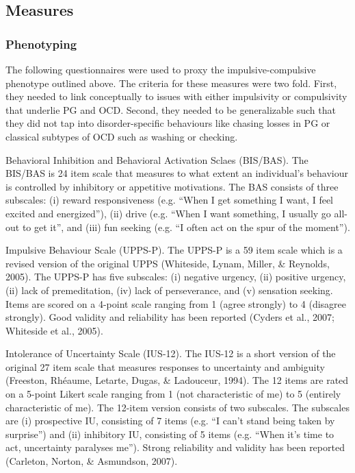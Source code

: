 \subsection{Measures}

\subsubsection{Phenotyping}
	
The following questionnaires were used to proxy the impulsive-compulsive phenotype outlined above. The criteria for these measures were two fold. First, they needed to link conceptually to issues with either impulsivity or compulsivity that underlie PG and OCD. Second, they needed to be generalizable such that they did not tap into disorder-specific behaviours like chasing losses in PG or classical subtypes of OCD such as washing or checking.

Behavioral Inhibition and Behavioral Activation Sclaes (BIS/BAS). The BIS/BAS \cite{Carver_1994} is 24 item scale that measures to what extent an individual’s behaviour is controlled by inhibitory or appetitive motivations. The BAS consists of three subscales: (i) reward responsiveness (e.g. “When I get something I want, I feel excited and energized”), (ii) drive (e.g. “When I want something, I usually go all-out to get it”, and (iii) fun seeking (e.g. “I often act on the spur of the moment”).

Impulsive Behaviour Scale (UPPS-P). The UPPS-P \cite{Cyders_2007} is a 59 item scale which is a revised version of the original UPPS (Whiteside, Lynam, Miller, & Reynolds, 2005).  The UPPS-P has five subscales: (i) negative urgency, (ii) positive urgency, (ii) lack of premeditation, (iv) lack of perseverance, and (v) sensation seeking. Items are scored on a 4-point scale ranging from 1 (agree strongly) to 4 (disagree strongly). Good validity and reliability has been reported (Cyders et al., 2007; Whiteside et al., 2005).

Intolerance of Uncertainty Scale (IUS-12). The IUS-12 is a short version of the original 27 item scale that measures responses to uncertainty and ambiguity (Freeston, Rhéaume, Letarte, Dugas, & Ladouceur, 1994).  The 12 items are rated on a 5-point Likert scale ranging from 1 (not characteristic of me) to 5 (entirely characteristic of me). The 12-item version consists of two subscales. The subscales are (i) prospective IU, consisting of 7 items (e.g. “I can’t stand being taken by surprise”) and (ii) inhibitory IU, consisting of 5 items (e.g. “When it’s time to act, uncertainty paralyses me”).  Strong reliability and validity has been reported (Carleton, Norton, & Asmundson, 2007).

